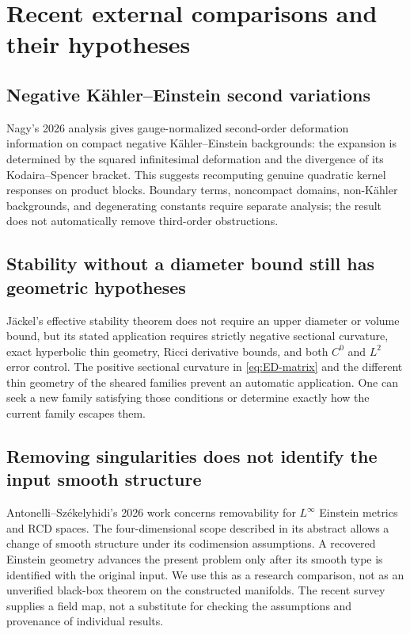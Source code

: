\documentclass[a4paper,11pt]{article}
\theoremstyle{definition}
\begin{document}
\section{Recent external comparisons and their hypotheses}\label{sec:literature}
\subsection{Negative K\"ahler--Einstein second variations}\label{sec:Nagy}
Nagy's 2026 analysis \cite{Nagy} gives gauge-normalized second-order
deformation information on compact negative K\"ahler--Einstein
backgrounds: the expansion is determined by the squared infinitesimal
deformation and the divergence of its Kodaira--Spencer bracket.
This suggests recomputing genuine quadratic kernel responses on
product blocks. Boundary terms, noncompact domains, non-K\"ahler
backgrounds, and degenerating constants require separate analysis;
the result does not automatically remove third-order obstructions.

\subsection{Stability without a diameter bound still has geometric hypotheses}
\label{sec:Jackel}
J\"ackel's effective stability theorem \cite{Jackel} does not require
an upper diameter or volume bound, but its stated application requires
strictly negative sectional curvature, exact hyperbolic thin geometry,
Ricci derivative bounds, and both $C^0$ and $L^2$ error control.
The positive sectional curvature in \eqref{eq:ED-matrix} and the
different thin geometry of the sheared families prevent an automatic
application. One can seek a new family satisfying those conditions
or determine exactly how the current family escapes them.

\subsection{Removing singularities does not identify the input smooth structure}
\label{sec:removability}
Antonelli--Sz\'ekelyhidi's 2026 work \cite{AS} concerns removability
for $L^\infty$ Einstein metrics and RCD spaces. The four-dimensional
scope described in its abstract allows a change of smooth structure
under its codimension assumptions. A recovered Einstein geometry
advances the present problem only after its smooth type is identified
with the original input. We use this as a research comparison, not
as an unverified black-box theorem on the constructed manifolds.
The recent survey \cite{LeBrunSurvey} supplies a field map, not a
substitute for checking the assumptions and provenance of individual results.
\end{document}

